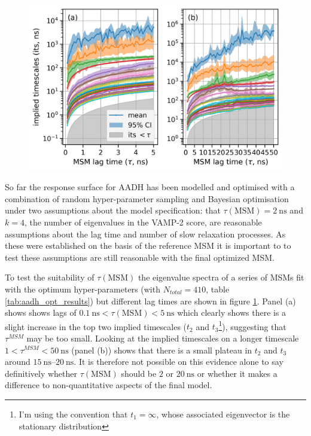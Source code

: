 \begin{figure}
    \centering
    \label{fig:aadh_its}
    \includegraphics[width=0.9\linewidth]{chapters/msm_optimization/figures/aadh_implied_timescales.png}
\end{figure}

So far the response surface for AADH has been modelled and optimised with a combination of random hyper-parameter sampling and Bayesian optimisation under two assumptions about the model specification: that $\tau(\mathrm{MSM}) = \SI{2}{\nano\second}$ and $k=4$, the number of eigenvalues in the VAMP-2 score, are reasonable assumptions about the lag time and number of slow relaxation processes. As these were established on the basis of the reference MSM it is important to to test these assumptions are still reasonable with the final optimized MSM. 

To test the suitability of $\tau(\mathrm{MSM})$ the eigenvalue spectra of a series of MSMs fit with the optimum hyper-parameters (with $N_{total}=410$, table \ref{tab:aadh_opt_results}) but different lag times are shown in figure \ref{fig:aadh_its}. Panel (a) shows shows lags of  $\SI{0.1}{\nano\second} < \tau(\mathrm{MSM}) < \SI{5}{\nano\second}$ which clearly shows there is a slight increase in the top two implied timescales ($t_{2}$ and $t_{3}$\footnote{I'm using the convention that $t_{1} = \infty$, whose associated eigenvector is the stationary distribution}), suggesting that $\tau^{MSM}$ may be too small. Looking at the implied timescales on a longer timescale $1 < \tau^{MSM} < \SI{50}{\nano\second}$ (panel (b)) shows that there is a small plateau in $t_{2}$ and $t_{3}$  around  $\SIrange{15}{20}{\nano\second}$. It is therefore not possible on this evidence alone to say definitively whether $\tau(\mathrm{MSM})$ should be $2$ or $\SI{20}{\nano\second}$ or whether it makes a difference to non-quantitative aspects of the final model.  

